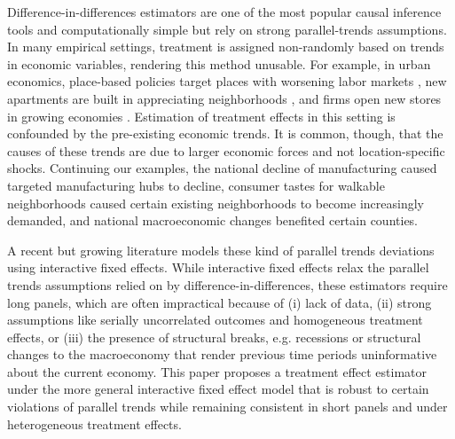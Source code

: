 \documentclass[12pt]{article}
\begin{document}
Difference-in-differences estimators are one of the most popular causal inference tools and computationally simple but rely on strong parallel-trends assumptions. In many empirical settings, treatment is assigned non-randomly based on trends in economic variables, rendering this method unusable. For example, in urban economics, place-based policies target places with worsening labor markets \citep{neumark2015place}, new apartments are built in appreciating neighborhoods \citep{asquith2021local,pennington2021does}, and firms open new stores in growing economies \citep{basker2005job,neumark2008effects}. Estimation of treatment effects in this setting is confounded by the pre-existing economic trends. It is common, though, that the causes of these trends are due to larger economic forces and not location-specific shocks. Continuing our examples, the national decline of manufacturing caused targeted manufacturing hubs to decline, consumer tastes for walkable neighborhoods caused certain existing neighborhoods to become increasingly demanded, and national macroeconomic changes benefited certain counties. 

A recent but growing literature models these kind of parallel trends deviations using interactive fixed effects. While interactive fixed effects relax the parallel trends assumptions relied on by difference-in-differences, these estimators require long panels, which are often impractical because of (i) lack of data, (ii) strong assumptions like serially uncorrelated outcomes and homogeneous treatment effects, or (iii) the presence of structural breaks, e.g. recessions or structural changes to the macroeconomy that render previous time periods uninformative about the current economy. This paper proposes a treatment effect estimator under the more general interactive fixed effect model that is robust to certain violations of parallel trends while remaining consistent in short panels and under heterogeneous treatment effects. 
\end{document}
